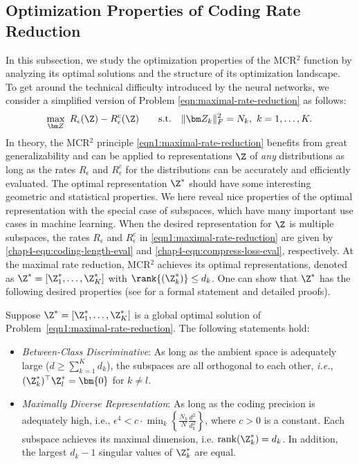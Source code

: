 \documentclass[../../book-main.tex]{subfiles}
\begin{document}
\vspace{-0.1in}


\subsection{Optimization Properties of Coding Rate Reduction}
\label{sec:MCR-landscape}

In this subsection, we study the optimization properties of the MCR$^2$ function by analyzing its optimal solutions and the structure of its optimization landscape. To get around the technical difficulty introduced by the neural networks, we consider a simplified version of Problem \eqref{eqn:maximal-rate-reduction} as follows: 
\begin{align}\label{eqn1:maximal-rate-reduction}
    \max_{\bm Z}\ R_{\epsilon}(\Z) - R_{\epsilon}^c(\Z)\qquad \mathrm{s.t.}\quad \|\bm Z_k\|_F^2 = N_k,\ k =1,\dots,K. 
\end{align}
In theory, the MCR$^2$ principle \eqref{eqn1:maximal-rate-reduction} benefits from great generalizability and can be applied to representations $\Z$ of {\em any} distributions  as long as the rates $R_\epsilon$ and $R^c_\epsilon$ for the distributions can be accurately and efficiently evaluated. The optimal representation $\Z^{\ast}$  should have some interesting geometric and statistical properties. We here reveal nice properties of the optimal representation with the special case of subspaces, which have many important use cases in machine learning. When the desired representation for $\Z$ is multiple subspaces, the rates $R_\epsilon$ and $R^c_\epsilon$ in \eqref{eqn1:maximal-rate-reduction} are given by \eqref{chap4-eqn:coding-length-eval}
and \eqref{chap4-eqn:compress-loss-eval}, respectively. At the maximal rate reduction, MCR$^2$ achieves its optimal representations, denoted as $\Z^{\ast} = [\Z_1^*,\dots,\Z_K^*]$ with $\rank{(\Z_{k}^*)}\le d_k$. One can show that $\Z^{\ast}$ has the following desired properties (see \cite{yu2020learning} for a formal statement and detailed proofs).

\begin{theorem}
	Suppose $\Z^{\ast} = [\Z_1^*,\dots,\Z_K^*]$ is a global optimal solution of Problem~\eqref{eqn1:maximal-rate-reduction}. The following statements hold: 
	\begin{itemize}
		\item {\em Between-Class Discriminative}: As long as the ambient space is adequately large ($d \ge \sum_{k=1}^{K} d_k$), the subspaces are all orthogonal to each other, {\em i.e.}, $(\Z_{k}^*)^{\top} \Z_{l}^* = \bm{0}$ for $k \not= l$.
		\item {\em Maximally Diverse Representation}:
		      As long as the coding precision is adequately high, i.e., $\epsilon ^4 < c\cdot \min_{k}\left\{ \frac{N_k}{N}\frac{d^2}{d_k^2}\right\}$, where $c>0$ is a constant. Each subspace achieves its maximal dimension, i.e. $\mathrm{rank}{(\Z_{k}^*)}= d_k$. In addition, the largest $d_k-1$ singular values of $\Z_{k}^*$ are equal.
		      \label{thm:MCR2-properties}
	\end{itemize}
\end{theorem}
\end{document}
